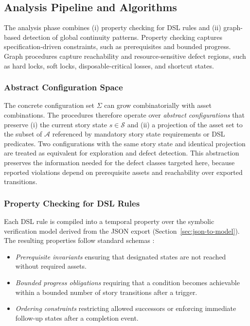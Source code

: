 \documentclass[conference]{IEEEtran}
\newcommand{\States}{\mathcal{S}}
\newcommand{\Assets}{\mathcal{A}}
\begin{document}
\subsection{Analysis Pipeline and Algorithms}
\label{sec:algorithms}

The analysis phase combines (i) property checking for DSL rules and
(ii) graph-based detection of global continuity patterns. Property
checking captures specification-driven constraints, such as prerequisites
and bounded progress. Graph procedures capture reachability and
resource-sensitive defect regions, such as hard locks, soft locks,
disposable-critical losses, and shortcut states.

\subsubsection{Abstract Configuration Space}

The concrete configuration set $\Sigma$ can grow combinatorially with
asset combinations. The procedures therefore operate over
\emph{abstract configurations} that preserve (i) the current story state
$s \in \States$ and (ii) a projection of the asset set to the subset of
$\Assets$ referenced by mandatory story state requirements or DSL
predicates. Two configurations with the same story state and identical
projection are treated as equivalent for exploration and defect
detection. This abstraction preserves the information needed for the defect classes
targeted here, because reported violations depend on prerequisite assets
and reachability over exported transitions.

\subsubsection{Property Checking for DSL Rules}

Each DSL rule is compiled into a temporal property over the symbolic
verification model derived from the JSON export
(Section~\ref{sec:json-to-model}). The resulting properties follow
standard schemas \cite{Clarke2018ModelChecking2e}:

\begin{itemize}[leftmargin=1.3em]
  \item \emph{Prerequisite invariants} ensuring that designated states
        are not reached without required assets.
  \item \emph{Bounded progress obligations} requiring that a condition
        becomes achievable within a bounded number of story transitions
        after a trigger.
  \item \emph{Ordering constraints} restricting allowed successors or
        enforcing immediate follow-up states after a completion event.
\end{itemize}
\end{document}
